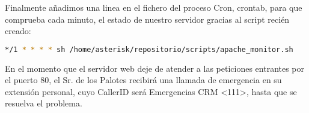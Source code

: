 

Finalmente añadimos una linea en el fichero del proceso Cron, crontab, para que comprueba cada minuto, el estado de nuestro servidor gracias al script recién creado:

\begin{lstlisting}[language=bash,title={/etc/asterisk/extensions.conf}]
*/1 * * * * sh /home/asterisk/repositorio/scripts/apache_monitor.sh
\end{lstlisting}

En el momento que el servidor web deje de atender a las peticiones entrantes por el puerto 80, el Sr. de los Palotes recibirá una llamada de emergencia en su extensión personal, cuyo CallerID será Emergencias CRM <111>, hasta que se resuelva el problema.
 